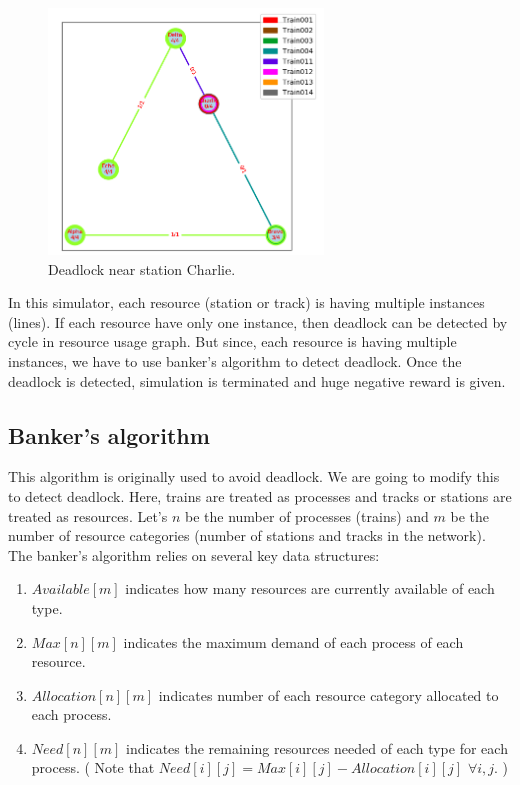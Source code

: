 \begin{figure}[h]
    \centering
    \includegraphics[width=0.65\textwidth]{deadlock}
    \caption{ Deadlock near station Charlie.  }
    \label{image-myimage6}
\end{figure}

In this simulator, each resource (station or track) is having multiple instances
(lines). If each resource have only one instance, then deadlock can be detected by cycle in resource 
usage graph. But since, each resource is having multiple instances, we have to use banker's algorithm to detect deadlock.
Once the deadlock is detected, simulation is terminated and huge negative reward is given.

\subsection{Banker's algorithm}

This algorithm is originally used to avoid deadlock. We are going to modify this to detect deadlock.
Here, trains are treated as processes and tracks or stations are treated as resources.
Let's $n$ be the number of processes (trains) and $m$ be the number of resource categories (number of stations and tracks in 
the network). The banker's algorithm relies on several key data structures:
\begin{enumerate}
\item $Available[m]$ indicates how many resources are currently available of each type.
\item $Max[n][m]$ indicates the maximum demand of each process of each resource.
\item $Allocation[n][m]$ indicates number of each resource category allocated to each process.
\item $Need[n][m]$ indicates the remaining resources needed of each type for each process. 
( Note that $Need[i][j] = Max[i][j] - Allocation[i][j]$   $\forall i, j$. )
\end{enumerate}

